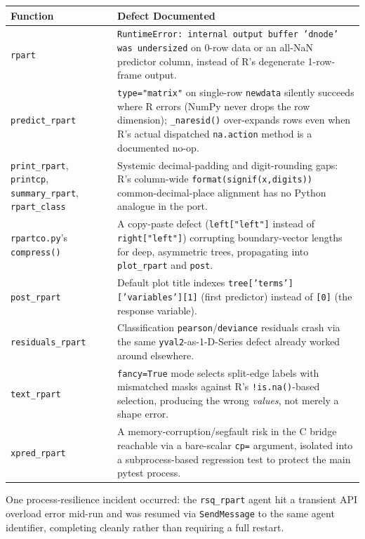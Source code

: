 \documentclass[12pt]{article}
\begin{document}
\medskip
\begin{center}
\begin{tabular}{p{2.6cm}p{9.9cm}}
\toprule
Function & Defect Documented \\
\midrule
\texttt{rpart} & \texttt{RuntimeError: internal output buffer 'dnode' was undersized} on 0-row data or an all-NaN predictor column, instead of R's degenerate 1-row-frame output. \\
\texttt{predict\_rpart} & \texttt{type="matrix"} on single-row \texttt{newdata} silently succeeds where R errors (NumPy never drops the row dimension); \texttt{\_naresid()} over-expands rows even when R's actual dispatched \texttt{na.action} method is a documented no-op. \\
\texttt{print\_rpart}, \texttt{printcp}, \texttt{summary\_rpart}, \texttt{rpart\_class} & Systemic decimal-padding and digit-rounding gaps: R's column-wide \texttt{format(signif(x,digits))} common-decimal-place alignment has no Python analogue in the port. \\
\texttt{rpartco.py}'s \texttt{compress()} & A copy-paste defect (\texttt{left["left"]} instead of \texttt{right["left"]}) corrupting boundary-vector lengths for deep, asymmetric trees, propagating into \texttt{plot\_rpart} and \texttt{post}. \\
\texttt{post\_rpart} & Default plot title indexes \texttt{tree['terms']['variables'][1]} (first predictor) instead of \texttt{[0]} (the response variable). \\
\texttt{residuals\_rpart} & Classification \texttt{pearson}/\texttt{deviance} residuals crash via the same \texttt{yval2}-as-1-D-Series defect already worked around elsewhere. \\
\texttt{text\_rpart} & \texttt{fancy=True} mode selects split-edge labels with mismatched masks against R's \texttt{!is.na()}-based selection, producing the wrong \emph{values}, not merely a shape error. \\
\texttt{xpred\_rpart} & A memory-corruption/segfault risk in the C bridge reachable via a bare-scalar \texttt{cp=} argument, isolated into a subprocess-based regression test to protect the main pytest process. \\
\bottomrule
\end{tabular}
\end{center}
\medskip

One process-resilience incident occurred: the \texttt{rsq\_rpart} agent hit a transient API overload error mid-run and was resumed via \texttt{SendMessage} to the same agent identifier, completing cleanly rather than requiring a full restart.
\end{document}
